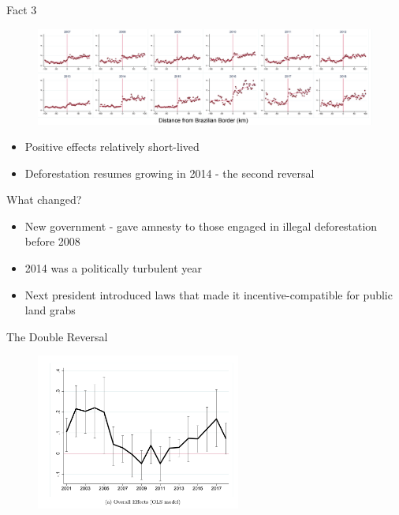 \documentclass[11pt,notes=hide,aspectratio=169,mathserif]{beamer}
\begin{document}
\begin{frame}{Fact 3}
\begin{figure}
\centering
\includegraphics[width=1\textwidth]{../TA9/inputs/fig_post.png}
\end{figure}
\begin{itemize}
\item Positive effects relatively short-lived 
\item Deforestation resumes growing in 2014 - the second reversal
\end{itemize}
\end{frame}

\begin{frame}{What changed?}
\begin{itemize}
\item New government - gave amnesty to those engaged in illegal deforestation before 2008
\item 2014 was a politically turbulent year
\item Next president introduced laws that made it incentive-compatible for public land grabs
\end{itemize}
\end{frame}

\begin{frame}{The Double Reversal}
\begin{figure}
\centering
\includegraphics[width=0.6\textwidth]{../TA9/inputs/reversal.png}
\end{figure}
\end{frame}
\end{document}
